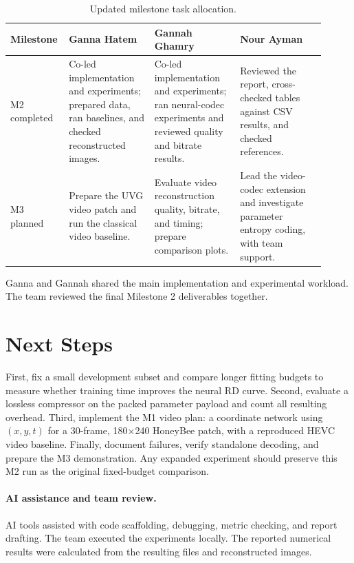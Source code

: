 \documentclass[11pt]{article}
\begin{document}
\begin{itemize}
    \begin{table}[htbp]
\centering
\small
\caption{Updated milestone task allocation.}
\label{tab:tasks}
\begin{tabular}{@{}p{0.13\linewidth}
                  p{0.26\linewidth}
                  p{0.26\linewidth}
                  p{0.26\linewidth}@{}}
\toprule
\textbf{Milestone} &
\textbf{Ganna Hatem} &
\textbf{Gannah Ghamry} &
\textbf{Nour Ayman} \\
\midrule

M2 completed &
Co-led implementation and experiments; prepared data,
ran baselines, and checked reconstructed images. &
Co-led implementation and experiments; ran neural-codec
experiments and reviewed quality and bitrate results. &
Reviewed the report, cross-checked tables against CSV
results, and checked references. \\

\addlinespace
M3 planned &
Prepare the UVG video patch and run the classical
video baseline. &
Evaluate video reconstruction quality, bitrate,
and timing; prepare comparison plots. &
Lead the video-codec extension and investigate
parameter entropy coding, with team support. \\

\bottomrule
\end{tabular}
\end{table}
\end{itemize}
Ganna and Gannah shared the main implementation and
experimental workload. The team reviewed the final
Milestone 2 deliverables together.

\section{Next Steps}
First, fix a small development subset and compare longer fitting budgets to measure whether training time improves the neural RD curve. Second, evaluate a lossless compressor on the packed parameter payload and count all resulting overhead. Third, implement the M1 video plan: a coordinate network using $(x,y,t)$ for a 30-frame, 180$\times$240 HoneyBee patch, with a reproduced HEVC video baseline. Finally, document failures, verify standalone decoding, and prepare the M3 demonstration. Any expanded experiment should preserve this M2 run as the original fixed-budget comparison.
\paragraph{AI assistance and team review.} 
AI tools assisted with code scaffolding, debugging,
metric checking, and report drafting. The team executed
the experiments locally. The reported numerical results
were calculated from the resulting files and reconstructed
images.



\end{document}
